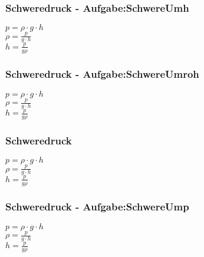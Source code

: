 \subsubsection{Schweredruck - Aufgabe:SchwereUmh} 
\begin{minipage}{0.45\textwidth} 
$ p =  \rho \cdot g\cdot h $\\ 
$ \rho  = \frac{p}{g\cdot h} $\\ 
$ h = \frac{p}{g \rho } $\\ 
\end{minipage} 
\begin{minipage}{0.45\textwidth} 
 
\end{minipage} 
\subsubsection{Schweredruck - Aufgabe:SchwereUmroh} 
\begin{minipage}{0.45\textwidth} 
$ p =  \rho \cdot g\cdot h $\\ 
$ \rho  = \frac{p}{g\cdot h} $\\ 
$ h = \frac{p}{g \rho } $\\ 
\end{minipage} 
\begin{minipage}{0.45\textwidth} 
 
\end{minipage} 
\subsubsection{Schweredruck} 
\begin{minipage}{0.45\textwidth} 
$ p =  \rho \cdot g\cdot h $\\ 
$ \rho  = \frac{p}{g\cdot h} $\\ 
$ h = \frac{p}{g \rho } $\\ 
\end{minipage} 
\begin{minipage}{0.45\textwidth} 
 
\end{minipage} 
\subsubsection{Schweredruck - Aufgabe:SchwereUmp} 
\begin{minipage}{0.45\textwidth} 
$ p =  \rho \cdot g\cdot h $\\ 
$ \rho  = \frac{p}{g\cdot h} $\\ 
$ h = \frac{p}{g \rho } $\\ 
\end{minipage} 
\begin{minipage}{0.45\textwidth} 
 
\end{minipage} 
